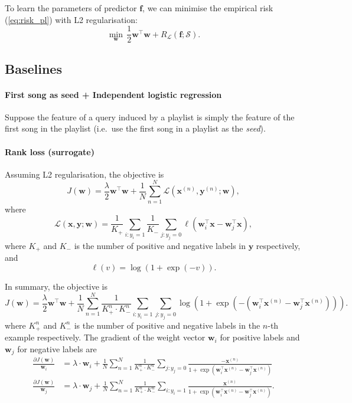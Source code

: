 \documentclass[9pt]{extarticle}
\newcommand{\f}{\mathbf{f}}
\newcommand{\x}{\mathbf{x}}
\newcommand{\y}{\mathbf{y}}
\newcommand{\1}{\mathbf{1}}
\newcommand{\w}{\mathbf{w}}
\newcommand{\LCal}{\mathcal{L}}
\newcommand{\SCal}{\mathcal{S}}
\newcommand{\pb}[1]{^{({#1})}}
\newcommand{\ie}{i.e.\ }
\begin{document}
To learn the parameters of predictor $\f$, we can minimise the empirical risk (\ref{eq:risk_pl}) with L2 regularisation:
\begin{equation}
\label{eq:minrisk_l2}
\min_{\w} \, \frac{1}{2} \w^\top \w + R_{\LCal}(\f; \SCal).
\end{equation}


\subsection{Baselines}

\paragraph{First song as seed +  Independent logistic regression}
Suppose the feature of a query induced by a playlist is simply the feature of the first song in the playlist 
(\ie use the first song in a playlist as the \emph{seed}).

\paragraph{Rank loss (surrogate)}
Assuming L2 regularisation, the objective is
\begin{equation*}
J(\w) = \frac{\lambda}{2}\w^\top \w + \frac{1}{N} \sum_{n=1}^N \LCal(\x\pb{n}, \y\pb{n}; \w),
\end{equation*}
where 
\begin{equation*}
\LCal(\x, \y; \w) = \frac{1}{K_+} \sum_{i: y_i = 1} \frac{1}{K_-} \sum_{j: y_j = 0} \ell(\w_i^\top \x - \w_j^\top \x),
\end{equation*}
where $K_+$ and $K_-$ is the number of positive and negative labels in $\y$ respectively,
and
\begin{equation*}
\ell(v) = \log(1 + \exp(-v)).
\end{equation*}

In summary, the objective is
\begin{equation}
\label{eq:obj_rank}
J(\w) = \frac{\lambda}{2} \w^\top \w + \frac{1}{N} \sum_{n=1}^N \frac{1}{K_+^n \cdot K_-^n} \sum_{i:y_i=1} \sum_{j:y_j=0} 
        \log(1 + \exp(-(\w_i^\top \x\pb{n} - \w_j^\top \x\pb{n}))).
\end{equation}
where $K_+^n$ and $K_-^n$ is the number of positive and negative labels in the $n$-th example respectively.
The gradient of the weight vector $\w_i$ for positive labels and $\w_j$ for negative labels are
\begin{align}
\frac{\partial J(\w)}{\w_i} & = \lambda \cdot \w_i + \frac{1}{N} \sum_{n=1}^N \frac{1}{K_+^n \cdot K_-^n} \sum_{j:y_j=0} 
                                \frac{-\x\pb{n}} {1 + \exp(\w_i^\top \x\pb{n} - \w_j^\top \x\pb{n})} \\
\frac{\partial J(\w)}{\w_j} & = \lambda \cdot \w_j + \frac{1}{N} \sum_{n=1}^N \frac{1}{K_+^n \cdot K_-^n} \sum_{i:y_i=1} 
                                \frac{\x\pb{n}} {1 + \exp(\w_i^\top \x\pb{n} - \w_j^\top \x\pb{n})}.
\end{align}
\end{document}
